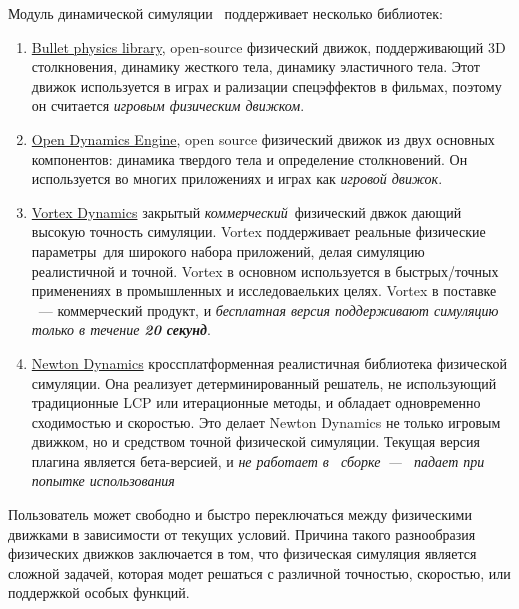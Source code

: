 \label{dynamics}


Модуль динамической симуляции \vrep\ поддерживает несколько библиотек:
\begin{enumerate}[nosep]
\item \href{http://www.bulletphysics.org/}{Bullet physics library},
open-source физический движок, поддерживающий 3D столкновения, динамику
жесткого тела, динамику эластичного тела. Этот движок используется в играх и рализации спецэффектов в фильмах,
поэтому он считается \emph{игровым физическим движком}.
	
\item \href{http://www.ode.org/}{Open Dynamics Engine},
open source физический движок из двух основных компонентов: динамика твердого 
тела и определение столкновений. Он используется во многих приложениях и играх
как \emph{игровой движок}.

\item \href{http://www.vxsim.com/}{Vortex Dynamics}
закрытый \emph{коммерческий}\ физический двжок дающий высокую точность 
симуляции. Vortex поддерживает реальные физические параметры\ для широкого набора приложений,
делая симуляцию реалистичной и точной. Vortex в основном используется
в быстрых/точных применениях в промышленных и исследоваельких целях.
Vortex в поставке \vrep\ --- коммерческий продукт, и \emph{бесплатная версия
поддерживают симуляцию только в течение \textbf{20 секунд}}.

\item \href{http://newtondynamics.com/forum/newton.php}{Newton Dynamics}
кроссплатформенная реалистичная библиотека физической симуляции.
Она реализует детерминированный решатель, не использующий традиционные
LCP или итерационные методы, и обладает одновременно сходимостью и скоростью.
Это делает Newton Dynamics не только игровым движком, но и средством
точной физической симуляции. Текущая версия плагина является бета-версией, и
\emph{не работает в \win\ сборке\ --- \vrep\ падает при попытке использования}
	
\end{enumerate}

Пользователь может свободно и быстро переключаться между физическими движками
в зависимости от текущих условий. Причина такого разнообразия физических 
движков заключается в том, что физическая симуляция является сложной задачей,
которая модет решаться с различной точностью, скоростью, или поддержкой
особых функций.

